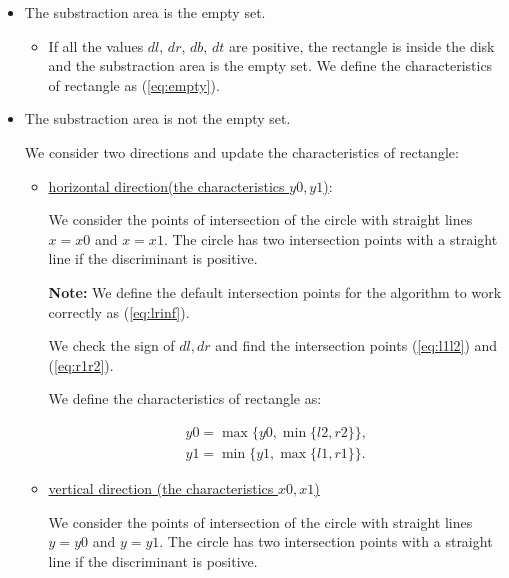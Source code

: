 \documentclass{report}
\begin{document}
\begin{itemize}
	
	\item The substraction area is the empty set.
	
	\begin{itemize}
		
 		\item If all the values $dl$, $dr$, $db$, $dt$  are positive, the rectangle is inside the disk and the substraction area is the empty set. We define the characteristics of rectangle as (\ref{eq:empty}).
 		
 	\end{itemize}
 
   \item The substraction area is not the empty set.
 
   We consider two directions and update the characteristics of rectangle:
	
	\begin{itemize}
		
		\item \underline {horizontal direction(the characteristics $y0, y1$)}:
		
		We consider the points of intersection of the circle with straight lines $x = x0$ and $x = x1$. The circle has two intersection points with a straight line if the discriminant is positive.
		
		{\bfseries Note:} We define the default intersection points for the algorithm to work correctly as (\ref{eq:lrinf}).
		
		We check the sign of $dl, dr$ and find the intersection points (\ref{eq:l1l2}) and (\ref{eq:r1r2}).
		
		We define the characteristics of rectangle as:
		
		\begin{equation}
			\begin{gathered}
				y0 = \max\{y0, \min\{l2, r2\}\},\\
				y1 = \min\{y1, \max\{l1, r1\}\}.
			\end{gathered}
		\end{equation}
		
		\item \underline {vertical direction (the characteristics $x0, x1$) }
		
		 We consider the points of intersection of the circle with straight lines $y = y0$ and $y = y1$. The circle has two intersection points with a straight line if the discriminant is positive.
		

\end{itemize}
\end{itemize}
\end{document}
